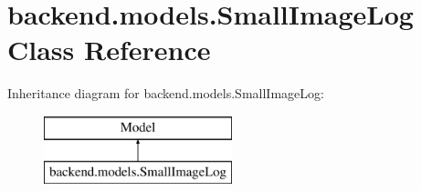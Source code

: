 \hypertarget{classbackend_1_1models_1_1_small_image_log}{}\section{backend.\+models.\+Small\+Image\+Log Class Reference}
\label{classbackend_1_1models_1_1_small_image_log}
Inheritance diagram for backend.\+models.\+Small\+Image\+Log\+:\begin{figure}[H]
\begin{center}
\leavevmode
\includegraphics[height=2.000000cm]{classbackend_1_1models_1_1_small_image_log}
\end{center}
\end{figure}
